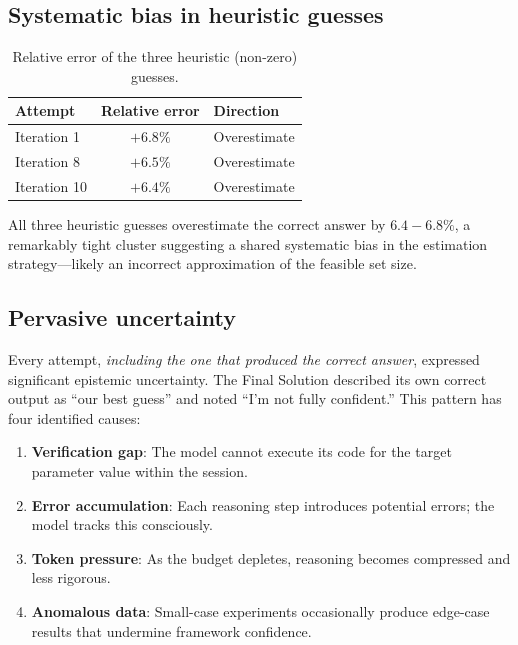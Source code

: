 \documentclass[11pt,a4paper]{article}
\begin{document}
\subsection{Systematic bias in heuristic guesses}

\begin{table}[H]
\centering
\caption{Relative error of the three heuristic (non-zero) guesses.}
\label{tab:errors}
\begin{tabular}{@{}lcl@{}}
\toprule
\textbf{Attempt} & \textbf{Relative error} & \textbf{Direction} \\
\midrule
Iteration 1  & $+6.8\%$ & Overestimate \\
Iteration 8  & $+6.5\%$ & Overestimate \\
Iteration 10 & $+6.4\%$ & Overestimate \\
\bottomrule
\end{tabular}
\end{table}

All three heuristic guesses overestimate the correct answer by
$6.4{-}6.8\%$, a remarkably tight cluster suggesting a shared
systematic bias in the estimation strategy---likely an incorrect
approximation of the feasible set size.

\subsection{Pervasive uncertainty}

\begin{pattern}[title={Uncertainty regardless of correctness}]
Every attempt, \emph{including the one that produced the correct
answer}, expressed significant epistemic uncertainty. The Final
Solution described its own correct output as ``our best guess''
and noted ``I'm not fully confident.'' This pattern has four
identified causes:
\begin{enumerate}[nosep]
  \item \textbf{Verification gap}: The model cannot execute its code
    for the target parameter value within the session.
  \item \textbf{Error accumulation}: Each reasoning step introduces
    potential errors; the model tracks this consciously.
  \item \textbf{Token pressure}: As the budget depletes, reasoning
    becomes compressed and less rigorous.
  \item \textbf{Anomalous data}: Small-case experiments occasionally
    produce edge-case results that undermine framework confidence.
\end{enumerate}
\end{pattern}
\end{document}
